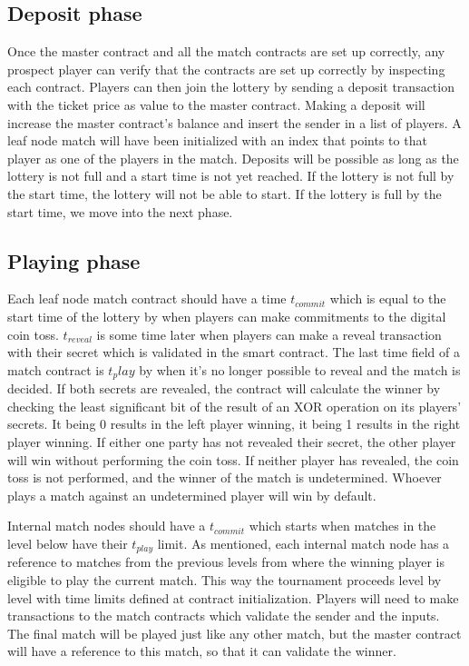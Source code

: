 \subsection{Deposit phase}
Once the master contract and all the match contracts are set up correctly, any prospect player can verify that the contracts are set up correctly by inspecting each contract. Players can then join the lottery by sending a deposit transaction with the ticket price as value to the master contract. Making a deposit will increase the master contract's balance and insert the sender in a list of players. A leaf node match will have been initialized with an index that points to that player as one of the players in the match. Deposits will be possible as long as the lottery is not full and a start time is not yet reached. If the lottery is not full by the start time, the lottery will not be able to start. If the lottery is full by the start time, we move into the next phase.

\subsection{Playing phase}
Each leaf node match contract should have a time $t_{commit}$ which is equal to the start time of the lottery by when players can make commitments to the digital coin toss. $t_{reveal}$ is some time later when players can make a reveal transaction with their secret which is validated in the smart contract. The last time field of a match contract is $t_play$ by when it's no longer possible to reveal and the match is decided. If both secrets are revealed, the contract will calculate the winner by checking the least significant bit of the result of an XOR operation on its players' secrets. It being 0 results in the left player winning, it being 1 results in the right player winning. If either one party has not revealed their secret, the other player will win without performing the coin toss. If neither player has revealed, the coin toss is not performed, and the winner of the match is undetermined. Whoever plays a match against an undetermined player will win by default.

Internal match nodes should have a $t_{commit}$ which starts when matches in the level below have their $t_{play}$ limit. As mentioned, each internal match node has a reference to matches from the previous levels from where the winning player is eligible to play the current match. This way the tournament proceeds level by level with time limits defined at contract initialization. Players will need to make transactions to the match contracts which validate the sender and the inputs. The final match will be played just like any other match, but the master contract will have a reference to this match, so that it can validate the winner.

